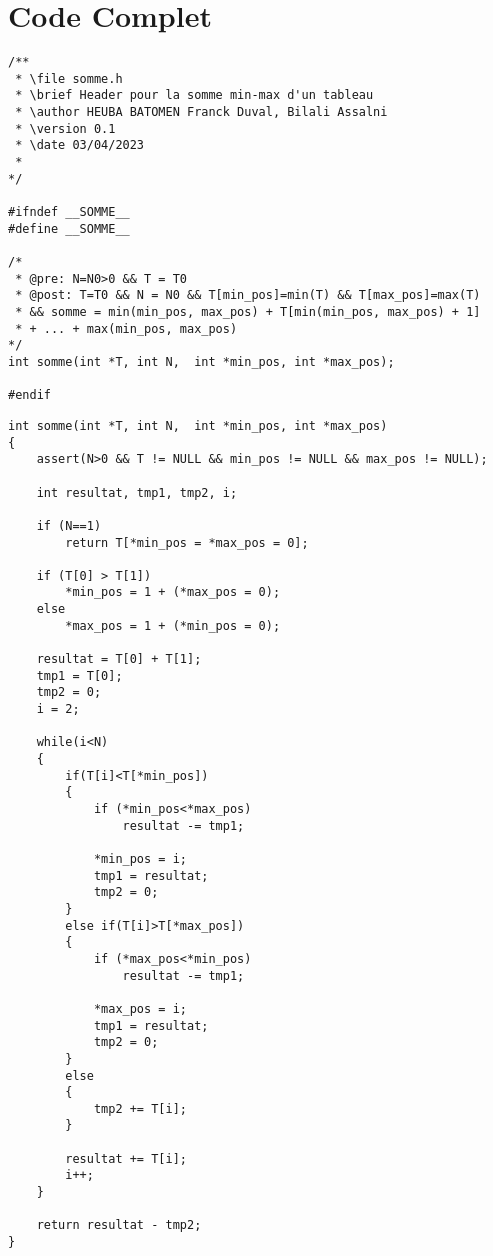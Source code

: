 \section{Code Complet}\label{code}

\begin{lstlisting}[caption={somme.h}]
/**
 * \file somme.h
 * \brief Header pour la somme min-max d'un tableau
 * \author HEUBA BATOMEN Franck Duval, Bilali Assalni
 * \version 0.1
 * \date 03/04/2023
 *
*/

#ifndef __SOMME__
#define __SOMME__

/*
 * @pre: N=N0>0 && T = T0
 * @post: T=T0 && N = N0 && T[min_pos]=min(T) && T[max_pos]=max(T) 
 * && somme = min(min_pos, max_pos) + T[min(min_pos, max_pos) + 1] 
 * + ... + max(min_pos, max_pos)  
*/
int somme(int *T, int N,  int *min_pos, int *max_pos);

#endif
\end{lstlisting}

\begin{lstlisting}[caption={somme.c}]
int somme(int *T, int N,  int *min_pos, int *max_pos)
{
    assert(N>0 && T != NULL && min_pos != NULL && max_pos != NULL);

    int resultat, tmp1, tmp2, i;

    if (N==1) 
        return T[*min_pos = *max_pos = 0];

    if (T[0] > T[1])
        *min_pos = 1 + (*max_pos = 0);
    else
        *max_pos = 1 + (*min_pos = 0);

    resultat = T[0] + T[1];
    tmp1 = T[0];
    tmp2 = 0;
    i = 2;

    while(i<N) 
    {
        if(T[i]<T[*min_pos])
        {
            if (*min_pos<*max_pos) 
                resultat -= tmp1;
                
            *min_pos = i;
            tmp1 = resultat;
            tmp2 = 0;
        }
        else if(T[i]>T[*max_pos])
        {
            if (*max_pos<*min_pos) 
                resultat -= tmp1;
            
            *max_pos = i;
            tmp1 = resultat;
            tmp2 = 0;
        }
        else 
        {
            tmp2 += T[i];
        }
        
        resultat += T[i];
        i++;
    }

    return resultat - tmp2;
}
\end{lstlisting}